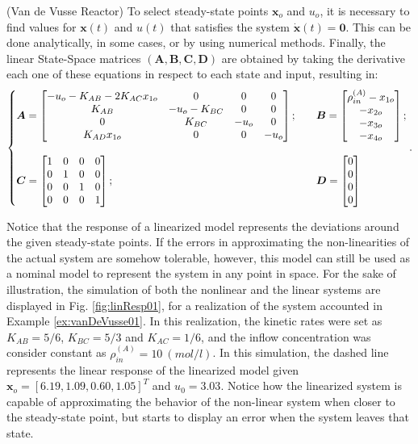 \documentclass[a4paper,11pt]{book}
\numberwithin{figure}{chapter}
\numberwithin{equation}{chapter}
\numberwithin{table}{chapter}
\theoremstyle{definition}
\newtheorem{example}{Example}[chapter]
\newcounter{boxed-theorem}
\newcounter{boxed-lemma}
\newcounter{boxed-definition}
\newcounter{boxed-example}
\newenvironment{boxed-example}[1]
{\colorlet{shadecolor}{pastelRed!15} \begin{shaded} \begin{example}{#1}}
{\end{example} \end{shaded}}
\begin{document}
\begin{boxed-example}{(Van de Vusse Reactor)}
	To select steady-state points $\bm{x}_o$ and $u_o$, it is necessary to find values for $\bm{x}(t)$ and $u(t)$ that satisfies the system $\dot{\bm{x}}(t) = \bm{0}$. This can be done analytically, in some cases, or by using numerical methods. Finally, the linear State-Space matrices $(\bm{A}, \bm{B}, \bm{C}, \bm{D})$ are obtained by taking the derivative each one of these equations in respect to each state and input, resulting in:
	\begin{align}   \label{eq:isoReact01}
	\left\{ \begin{matrix*}[l]
	    \bm{A} = \begin{bmatrix}
	        -u_o - K_{AB} - 2K_{AC} x_{1o} & 0 & 0 & 0 \\ K_{AB} & -u_o - K_{BC} & 0 & 0 \\ 0 & K_{BC} & -u_o & 0 \\ K_{AD} x_{1o} & 0 & 0 & -u_o
	    \end{bmatrix}; \hfill & &
	    \bm{B} = \begin{bmatrix}
	        \rho_{in}^{(A)}-x_{1o} \\ -x_{2o} \\ -x_{3o} \\ -x_{4o} 
	    \end{bmatrix}; \hfill \\  \\ 
	    \bm{C} = \begin{bmatrix}
	        1 & 0 & 0 & 0 \\ 0 & 1 & 0 & 0 \\ 0 & 0 & 1 & 0 \\ 0 & 0 & 0 & 1
	    \end{bmatrix}; \hfill & &
	    \bm{D} = \begin{bmatrix}
	        0 \\ 0 \\ 0 \\ 0
	    \end{bmatrix} \hfill
	\end{matrix*} \right.
	.\end{align}
\end{boxed-example}

	Notice that the response of a linearized model represents the deviations around the given steady-state points. If the errors in approximating the non-linearities of the actual system are somehow tolerable, however, this model can still be used as a nominal model to represent the system in any point in space. For the sake of illustration, the simulation of both the nonlinear and the linear systems are displayed in Fig. \ref{fig:linResp01}, for a realization of the system accounted in Example \ref{ex:vanDeVusse01}. In this realization, the kinetic rates were set as $K_{AB} = 5/6$, $K_{BC} = 5/3$ and $K_{AC} = 1/6$, and the inflow concentration was consider constant as $\rho_{in}^{(A)} = 10\ (mol/l)$. In this simulation, the dashed line represents the linear response of the linearized model given $\bm{x}_o = [6.19, 1.09, 0.60, 1.05]^T$ and $u_0 = 3.03$. Notice how the linearized system is capable of approximating the behavior of the non-linear system when closer to the steady-state point, but starts to display an error when the system leaves that state.
	
\end{document}
